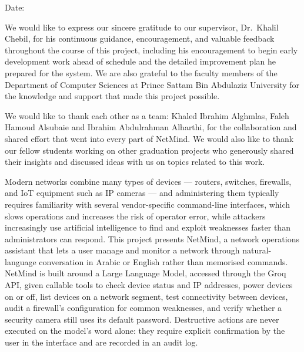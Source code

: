 \noindent Date:\ \makebox[7cm]{\dotfill}


We would like to express our sincere gratitude to our supervisor,
Dr.\ Khalil Chebil, for his continuous guidance, encouragement, and valuable
feedback throughout the course of this project, including his encouragement
to begin early development work ahead of schedule and the detailed
improvement plan he prepared for the system. We are also grateful to the
faculty members of the Department of Computer Sciences at Prince Sattam Bin
Abdulaziz University for the knowledge and support that made this project
possible.

We would like to thank each other as a team: Khaled Ibrahim Alghmlas, Faleh
Hamoud Alsubaie and Ibrahim Abdulrahman Alharthi, for the collaboration and
shared effort that went into every part of NetMind. We would also like to
thank our fellow students working on other graduation projects who generously
shared their insights and discussed ideas with us on topics related to this
work.


\begin{center}
\textbf{\projecttitle}
\end{center}

Modern networks combine many types of devices --- routers, switches,
firewalls, and IoT equipment such as IP cameras --- and administering them
typically requires familiarity with several vendor-specific command-line
interfaces, which slows operations and increases the risk of operator error,
while attackers increasingly use artificial intelligence to find and exploit
weaknesses faster than administrators can respond.
This project presents NetMind, a network operations assistant that lets a
user manage and monitor a network through natural-language conversation in
Arabic or English rather than memorised commands. NetMind is built around a
Large Language Model, accessed through the Groq API, given callable tools to
check device status and IP addresses, power devices on or off, list devices
on a network segment, test connectivity between devices, audit a firewall's
configuration for common weaknesses, and verify whether a security camera
still uses its default password. Destructive actions are never executed on
the model's word alone: they require explicit confirmation by the user in the
interface and are recorded in an audit log.

